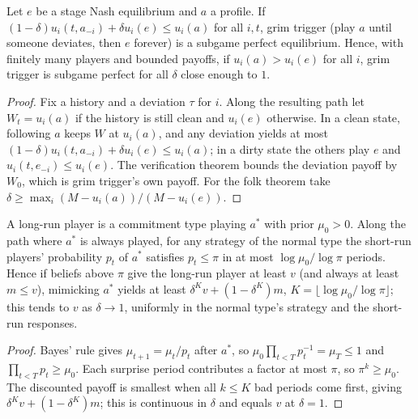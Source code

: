 \begin{theorem}
\label{thm:folk}
\leanok
{}
Let $e$ be a stage Nash equilibrium and $a$ a profile. If $(1-\delta)u_i(t, a_{-i}) + \delta u_i(e) \le u_i(a)$
for all $i, t$, grim trigger (play $a$ until someone deviates, then $e$ forever) is a subgame perfect
equilibrium. Hence, with finitely many players and bounded payoffs, if $u_i(a) > u_i(e)$ for all $i$,
grim trigger is subgame perfect for all $\delta$ close enough to $1$.
\end{theorem}
\begin{proof}
\leanok
Fix a history and a deviation $\tau$ for $i$. Along the resulting path let $W_t = u_i(a)$ if the history is still clean
and $u_i(e)$ otherwise. In a clean state, following $a$ keeps $W$ at $u_i(a)$, and any deviation yields at most
$(1-\delta)u_i(t,a_{-i}) + \delta u_i(e) \le u_i(a)$; in a dirty state the others play $e$ and $u_i(t, e_{-i}) \le u_i(e)$.
The verification theorem bounds the deviation payoff by $W_0$, which is grim trigger's own payoff.
For the folk theorem take $\delta \ge \max_i (M - u_i(a))/(M - u_i(e))$.
\end{proof}

\begin{theorem}
\label{thm:reputation}
\leanok
A long-run player is a commitment type playing $a^*$ with prior $\mu_0>0$. Along the path where $a^*$ is always
played, for any strategy of the normal type the short-run players' probability $p_t$ of $a^*$ satisfies
$p_t\le\pi$ in at most $\log\mu_0/\log\pi$ periods. Hence if beliefs above $\pi$ give the long-run player at least $v$
(and always at least $m\le v$), mimicking $a^*$ yields at least $\delta^K v+(1-\delta^K)m$, $K=\lfloor\log\mu_0/\log\pi\rfloor$;
this tends to $v$ as $\delta\to1$, uniformly in the normal type's strategy and the short-run responses.
\end{theorem}
\begin{proof}
\leanok
Bayes' rule gives $\mu_{t+1}=\mu_t/p_t$ after $a^*$, so $\mu_0\prod_{t<T}p_t^{-1}=\mu_T\le1$ and $\prod_{t<T}p_t\ge\mu_0$.
Each surprise period contributes a factor at most $\pi$, so $\pi^k\ge\mu_0$. The discounted payoff is smallest
when all $k\le K$ bad periods come first, giving $\delta^K v+(1-\delta^K)m$; this is continuous in $\delta$ and
equals $v$ at $\delta=1$.
\end{proof}


